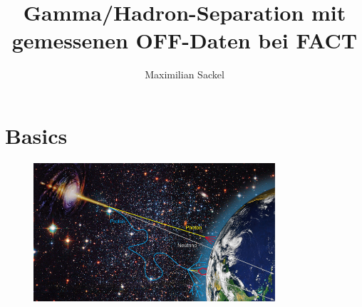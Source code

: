 \documentclass[aspectratio=1610, professionalfonts, 9pt]{beamer}
\title{Gamma/Hadron-Separation mit gemessenen OFF-Daten bei FACT}
\author[M.~Sackel]{Maximilian Sackel}
\institute[Experimental Physics 5b]{Experimental Physiks 5b \\  Astroteilchenphysik}
\begin{document}
\maketitle
\begin{frame}
  \the \textwidth
\end{frame}

\section{Basics}
\begin{frame}
  \begin{figure}
	\centering
	\includegraphics[width=0.8\textwidth]{./images/sources-detection.jpg}
	\cite{Overview}
  \end{figure}
\end{frame}
\end{document}
